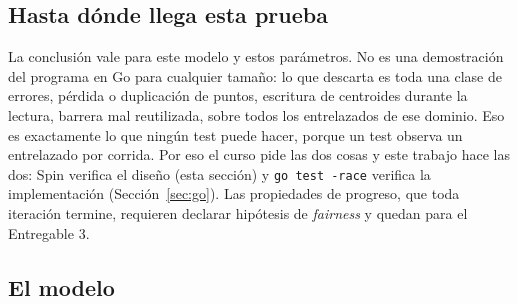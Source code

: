 

\subsection{Hasta dónde llega esta prueba}

La conclusión vale para este modelo y estos parámetros. No es una demostración del programa en Go
para cualquier tamaño: lo que descarta es toda una clase de errores, pérdida o duplicación de
puntos, escritura de centroides durante la lectura, barrera mal reutilizada, sobre todos los
entrelazados de ese dominio. Eso es exactamente lo que ningún test puede hacer, porque un test
observa un entrelazado por corrida. Por eso el curso pide las dos cosas y este trabajo hace las dos:
Spin verifica el diseño (esta sección) y \texttt{go test -race} verifica la implementación
(Sección~\ref{sec:go}). Las propiedades de progreso, que toda iteración termine, requieren declarar
hipótesis de \emph{fairness} y quedan para el Entregable 3.

\subsection{El modelo}



